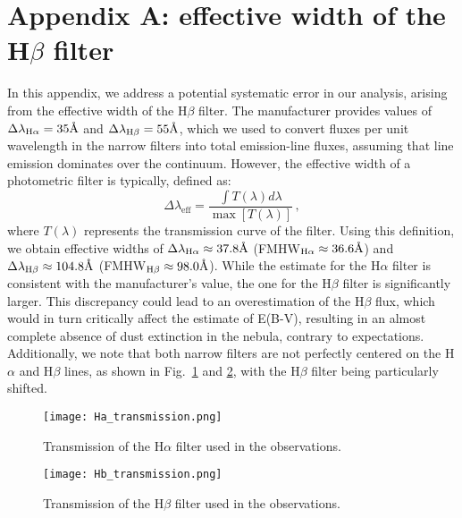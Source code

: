 \documentclass[fleqn,usenatbib]{mnras}
\begin{document}
\section{Appendix A: effective width of the H$\beta$ filter}\label{sec:appendix}
In this appendix, we address a potential systematic error in our analysis, arising from the effective width of the H$\beta$ filter.
The manufacturer provides values of $\Delta \lambda_{\text{H}\alpha} = 35 \text{\r{A}}$ and $\Delta \lambda_{\text{H}\beta} = 55 \text{\r{A}}$, which we used to convert fluxes per unit wavelength in the narrow filters into total emission-line fluxes, assuming that line emission dominates over the continuum.
However, the effective width of a photometric filter is typically, defined as:
\begin{equation}
  \Delta \lambda_\text{eff} = \dfrac{\int T(\lambda) d\lambda}{\max[{T(\lambda)}]} \, ,
  \label{eq:effective_width}
\end{equation}
where $T(\lambda)$ represents the transmission curve of the filter.
Using this definition, we obtain effective widths of $\Delta \lambda_{\text{H}\alpha} \approx 37.8 \text{\r{A}}$ (FMHW$_{\text{H}\alpha} \approx 36.6 \text{\r{A}}$) and $\Delta \lambda_{\text{H}\beta} \approx 104.8 \text{\r{A}}$ (FMHW$_{\text{H}\beta} \approx 98.0 \text{\r{A}}$).
While the estimate for the H$\alpha$ filter is consistent with the manufacturer's value, the one for the H$\beta$ filter is significantly larger.
This discrepancy could lead to an overestimation of the H$\beta$ flux, which would in turn critically affect the estimate of E(B-V), resulting in an almost complete absence of dust extinction in the nebula, contrary to expectations.
Additionally, we note that both narrow filters are not perfectly centered on the H$\alpha$ and H$\beta$ lines, as shown in Fig.~\ref{fig:Ha_transmission} and \ref{fig:Hb_transmission}, with the H$\beta$ filter being particularly shifted.

\begin{figure}\centering
	\texttt{[image: Ha\_transmission.png]}
    \caption{Transmission of the H$\alpha$ filter used in the observations.}
    \label{fig:Ha_transmission}
\end{figure}

\begin{figure}\centering
	\texttt{[image: Hb\_transmission.png]}
    \caption{Transmission of the H$\beta$ filter used in the observations.}
    \label{fig:Hb_transmission}
\end{figure}




 


\label{lastpage}
\end{document}

